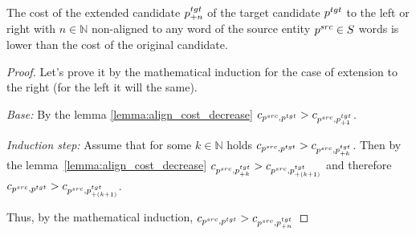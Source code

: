 \begin{corollary} \label{col:shrink_cand}
    The cost of the extended candidate \( p_{+n}^{tgt} \) of the target candidate \( p^{tgt} \) to the left or right with
    \( n \in \mathbb{N} \) non-aligned to any word of the source entity \( p^{src} \in S \) words is lower than
    the cost of the original candidate.
\end{corollary}
\begin{proof} Let's prove it by the mathematical induction for the case of extension to the right (for the left it will the same).

    \textit{Base:} By the lemma \ref{lemma:align_cost_decrease} \( c_{p^{src}, p^{tgt}} > c_{p^{src}, p_{+1}^{tgt}} \).

    \textit{Induction step:} Assume that for some \( k \in \mathbb{N} \) holds \( c_{p^{src}, p^{tgt}} > c_{p^{src}, p_{+k}^{tgt}} \).
    Then by the lemma~\ref{lemma:align_cost_decrease} \( c_{p^{src}, p_{+k}^{tgt}} > c_{p^{src}, p_{+(k+1)}^{tgt}} \) and therefore
    \( c_{p^{src}, p^{tgt}} > c_{p^{src}, p_{+(k+1)}^{tgt}} \).

    Thus, by the mathematical induction, \( c_{p^{src}, p^{tgt}} > c_{p^{src}, p_{+n}^{tgt}}   \)

\end{proof}

